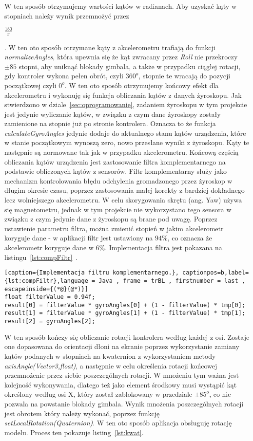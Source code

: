 W ten sposób otrzymujemy wartości kątów w radianach. Aby uzyskać kąty w stopniach należy wynik przemnożyć przez \begin{Large}$\frac{180}{\pi}$\end{Large}. W ten oto sposób otrzymane kąty z akcelerometru trafiają do funkcji \textit{normalizeAngles}, która upewnia się że kąt zwracany przez \textit{Roll} nie przekroczy $\pm 85$ stopni, aby uniknąć blokady gimbala, a także w przypadku ciągłej rotacji, gdy kontroler wykona pełen obrót, czyli $360^o$, stopnie te wracają do pozycji początkowej czyli $0^o$. W ten oto sposób otrzymujemy końcowy efekt dla akcelerometru i wykonuję się funkcja obliczania kątów z danych żyroskopu. Jak stwierdzono w dziale~\ref{sec:oprogramowanie}, zadaniem żyroskopu w tym projekcie jest jedynie wyliczanie kątów, w związku z czym dane żyroskopy zostały zamienione na stopnie już po stronie kontrolera. Oznacza to że funkcja \textit{calculateGyroAngles} jedynie dodaje do aktualnego stanu kątów urządzenia, które w stanie początkowym wynoszą zero, nowo przesłane wyniki z żyroskopu. Kąty te następnie są normowane tak jak w przypadku akcelerometru. Końcową częścią obliczania kątów urządzenia jest zastosowanie filtra komplementarnego na podstawie obliczonych kątów z sensorów. Filtr komplementarny służy jako mechanizm kontrolowania błędu odchylenia gromadzonego przez żyroskop w długim okresie czasu, poprzez zastosowania małej korekty z bardziej dokładnego lecz wolniejszego akcelerometru. W celu skorygowania skrętu (ang. Yaw) używa się magnetometru, jednak w tym projekcie nie wykorzystano tego sensora w związku z czym jedynie dane z żyroskopu są brane pod uwagę. Poprzez ustawienie parametru filtra, można zmienić stopień w jakim akcelerometr koryguje dane - w aplikacji filtr jest ustawiony na $94\%$, co oznacza że akcelerometr koryguje dane w $6\%$. Implementacja filtra jest pokazana na listingu~\ref{lst:compFiltr}~\cite{gimbal}.
\begin{lstlisting}[caption={Implementacja filtru komplementarnego.}, captionpos=b,label={lst:compFiltr},language = Java , frame = trBL , firstnumber = last , escapeinside={(*@}{@*)}]     
float filterValue = 0.94f;
result[0] = filterValue * gyroAngles[0] + (1 - filterValue) * tmp[0];
result[1] = filterValue * gyroAngles[1] + (1 - filterValue) * tmp[1];
result[2] = gyroAngles[2];                                                    
\end{lstlisting}
W ten sposób kończy się obliczanie rotacji kontrolera według każdej z osi. Zostaje one dopasowana do orientacji dłoni na ekranie poprzez wykorzystanie zamiany kątów podanych w stopniach na kwaternion z wykorzystaniem metody \textit{axisAngle(Vector3,float)}, a następnie w celu określenia rotacji końcowej przemnożenie przez siebie poszczególnych rotacji. W mnożeniu tym ważna jest kolejność wykonywania, dlatego też jako element środkowy musi wystąpić kąt określony według osi X, który został zablokowany w przedziale $\pm 85^o$, co nie pozwala na powstanie blokady gimbala. Wynik mnożenia poszczególnych rotacji jest obrotem który należy wykonać, poprzez funkcję \textit{setLocalRotation(Quaternion)}. W ten oto sposób aplikacja obsługuję rotację modelu. Proces ten pokazuje listing~\ref{lst:kwat}.
